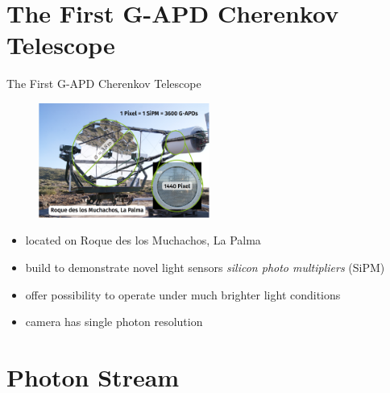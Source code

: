 



\maketitle

\section{The First G-APD Cherenkov Telescope}

\begin{frame}[t]{The First G-APD Cherenkov Telescope}
  \begin{multicols}{2}
    \vspace*{\fill}
    \begin{figure}
        \centering\includegraphics[width=0.5\textwidth]{fig/fact.png}
    \end{figure}
    \columnbreak
    \vspace*{\fill}
      \begin{itemize}
        \item located on Roque des los Muchachos, La Palma
        \item build to demonstrate novel light sensors \textit{silicon photo multipliers} (SiPM)
        \item offer possibility to operate under much brighter light conditions
        \item camera has single photon resolution
    \end{itemize}
    \vspace*{\fill}
  \end{multicols}
\end{frame}

\section{Photon Stream}

